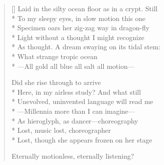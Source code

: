 \begin{verse}[\versewidth]
Laid in the silty ocean floor as in a crypt.  Still\\*
To my sleepy eyes, in slow motion this one\\*
Specimen oars her zig-zag way in dragon-fly\\*
Light without a thought I might recognize\\*
As thought. A dream swaying on its tidal stem:\\*
What strange tropic ocean\\*
---All gold all blue all salt all motion---

Did she rise through to arrive\\*
Here, in my airless study?  And what still\\*
Unevolved, uninvented language will read me\\*
---Millennia more than I can imagine---\\*
As hieroglyph, as dancer---choreography \\*
Lost, music lost, choreographer\\*
Lost, though she appears frozen on her stage

Eternally motionless, eternally listening?
\end{verse}
